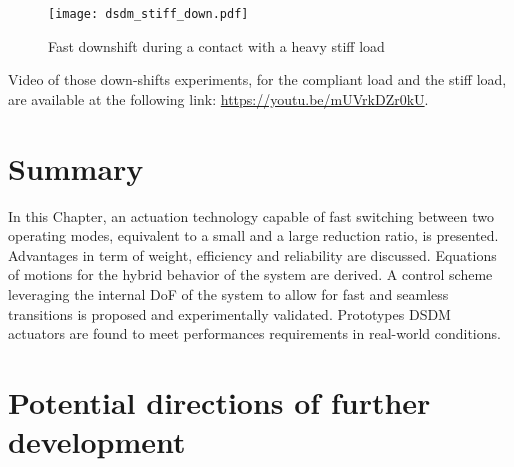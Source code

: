 \begin{figure}[p]
	\centering
		\texttt{[image: dsdm\_stiff\_down.pdf]}
	\caption{ Fast downshift during a contact with a heavy stiff load }
	\label{fig:dsdm_stiff_down}
\end{figure}

Video of those down-shifts experiments, for the compliant load and the stiff load, are available at the following link: \href{https://youtu.be/mUVrkDZr0kU}{https://youtu.be/mUVrkDZr0kU}.

%
%
%






\newpage

\section{Summary}

In this Chapter, an actuation technology capable of fast switching between two operating modes, equivalent to a small and a large reduction ratio, is presented. Advantages in term of weight, efficiency and reliability are discussed. Equations of motions for the hybrid behavior of the system are derived. A control scheme leveraging the internal DoF of the system to allow for fast and seamless transitions is proposed and experimentally validated. Prototypes DSDM actuators are found to meet performances requirements in real-world conditions.

\section{Potential directions of further development}

